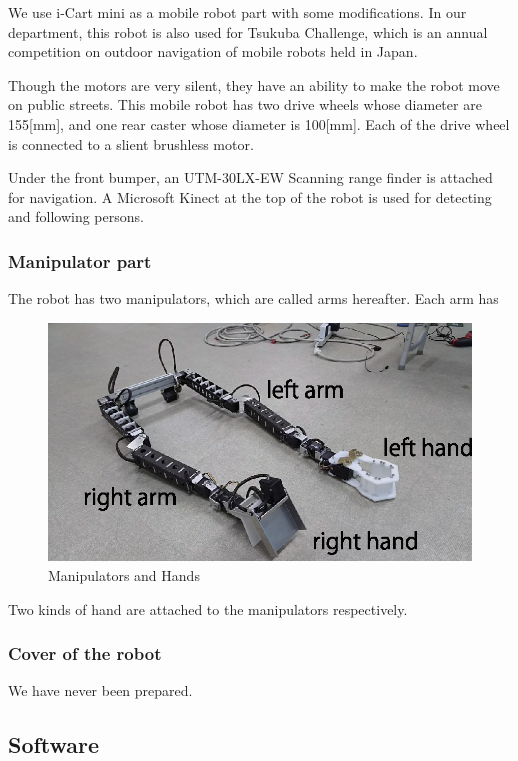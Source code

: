 \documentclass{llncs}
\begin{document}
We use i-Cart mini\cite{icartmini} as a mobile robot part
with some modifications. In our department, 
this robot is also used for Tsukuba Challenge,
which is an annual competition on outdoor navigation of mobile robots
held in Japan.

Though the motors are very silent, 
they have an ability to make the robot move on public streets.
This mobile robot has two drive wheels whose diameter are 155[mm], 
and one rear caster whose diameter is 100[mm].
Each of the drive wheel is connected to a slient brushless motor.

Under the front bumper, an UTM-30LX-EW Scanning range finder
is attached for navigation.
A Microsoft Kinect at the top of the robot is used for
detecting and following persons.


\subsubsection{Manipulator part}

The robot has two manipulators, which are called arms hereafter.
Each arm has 

\begin{figure}[h]
	\begin{center}
		\includegraphics[width=0.7\linewidth]{./IMAGE/manipulators.eps}
		\caption{Manipulators and Hands}
		\label{fig:manipulators}
	\end{center}
\end{figure}


Two kinds of hand are attached to
the manipulators respectively.

\subsubsection{Cover of the robot} We have never been prepared.

\subsection{Software}
\end{document}
